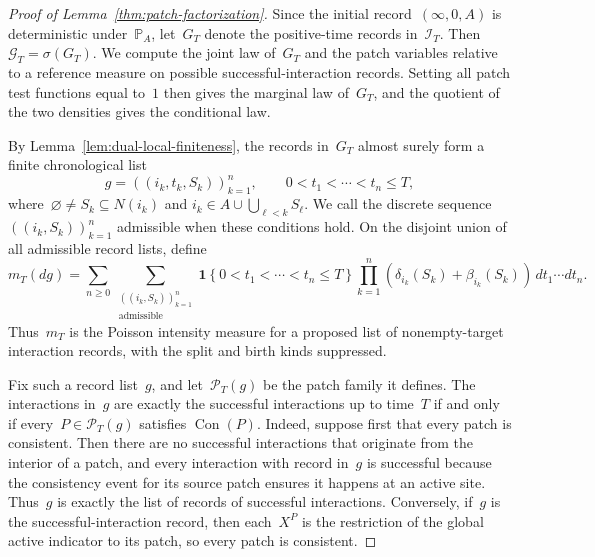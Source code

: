 \documentclass[EJP,preprint,NODS,nobera]{ejpecp}
\newcommand{\pP}{\mathbb{P}}
\newcommand{\bb}[1]{\left(#1\right)}
\newcommand{\cb}[1]{\left\{#1\right\}}
\newcommand{\ind}{\mathbf{1}}
\begin{document}
\begin{proof}[Proof of Lemma~\ref{thm:patch-factorization}]
Since the initial record~$(\infty,0,A)$ is deterministic under~$\pP_A$, let~$G_T$ denote the positive-time records in~$\mathcal I_T$. Then~$\mathcal G_T=\sigma(G_T)$.
We compute the joint law of~$G_T$ and the patch variables relative to a
reference measure on possible successful-interaction records. Setting all patch
test functions equal to~$1$ then gives the marginal law of~$G_T$, and the
quotient of the two densities gives the conditional law.

By Lemma~\ref{lem:dual-local-finiteness}, the records in~$G_T$ almost surely
form a finite chronological list
\begin{equation*}
g=\bb{(i_k,t_k,S_k)}_{k=1}^n,
\qquad
0<t_1<\cdots<t_n\leq T,
\end{equation*}
where~$\varnothing\neq S_k\subseteq N(i_k)$ and
$i_k\in A\cup\bigcup_{\ell<k}S_\ell$. We call the discrete sequence
$((i_k,S_k))_{k=1}^n$ admissible when these conditions hold. On the disjoint
union of all admissible record lists, define
\begin{equation}
\label{eq:patch-record-reference-measure}
m_T(dg)
=
\sum_{n\geq0}
\sum_{\substack{((i_k,S_k))_{k=1}^n\\\text{admissible}}}
\ind\cb{0<t_1<\cdots<t_n\leq T}
\prod_{k=1}^n
\bb{\delta_{i_k}(S_k)+\beta_{i_k}(S_k)}
\,dt_1\cdots dt_n.
\end{equation}
Thus~$m_T$ is the Poisson intensity measure for a proposed list of
nonempty-target interaction records, with the split and birth kinds suppressed.

Fix such a record list~$g$, and let~$\mathcal P_T(g)$ be the patch family it
defines. The interactions in~$g$ are exactly the successful interactions up to
time~$T$ if and only if every~$P\in\mathcal P_T(g)$ satisfies
$\operatorname{Con}(P)$. Indeed, suppose first that every patch is consistent.
Then there are no successful interactions that originate from the interior of a
patch, and every interaction with record in~$g$ is successful because the
consistency event for its source patch ensures it happens at an active site.
Thus~$g$ is exactly the list of records of successful interactions. Conversely,
if~$g$ is the successful-interaction record, then each~$X^P$ is the restriction
of the global active indicator to its patch, so every patch is consistent.


\end{proof}
\end{document}
